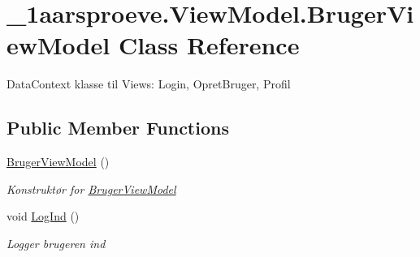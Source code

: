 \hypertarget{class__1aarsproeve_1_1_view_model_1_1_bruger_view_model}{}\section{\+\_\+1aarsproeve.\+View\+Model.\+Bruger\+View\+Model Class Reference}
\label{class__1aarsproeve_1_1_view_model_1_1_bruger_view_model}


Data\+Context klasse til Views\+: Login, Opret\+Bruger, Profil  


\subsection*{Public Member Functions}
\begin{DoxyCompactItemize}
\item 
\hyperlink{class__1aarsproeve_1_1_view_model_1_1_bruger_view_model_a2852c87e53378bf746f319770e026be5}{Bruger\+View\+Model} ()
\begin{DoxyCompactList}\small\item\em Konstruktør for \hyperlink{class__1aarsproeve_1_1_view_model_1_1_bruger_view_model}{Bruger\+View\+Model} \end{DoxyCompactList}\item 
void \hyperlink{class__1aarsproeve_1_1_view_model_1_1_bruger_view_model_a0df90b60137033df846e2aa184079a5d}{Log\+Ind} ()
\begin{DoxyCompactList}\small\item\em Logger brugeren ind \end{DoxyCompactList}\end{DoxyCompactItemize}

